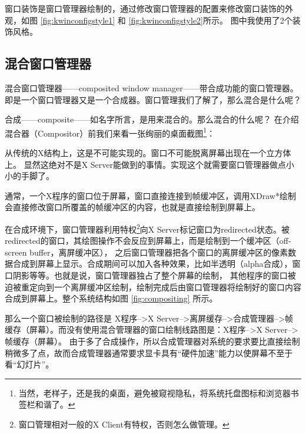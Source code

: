 \documentclass[amstex,twoside]{ctexbook}
\begin{document}
窗口装饰是窗口管理器绘制的，通过修改窗口管理器的配置来修改窗口装饰的外观，如图 \ref{fig:kwinconfigstyle1} 和 \ref{fig:kwinconfigstyle2}所示。
图中我使用了2个装饰风格。



\subsection{混合窗口管理器}

混合窗口管理器——composited window manager——带合成功能的窗口管理器。
即是一个窗口管理器又是一个合成器。窗口管理我们了解了，那么混合是什么呢？

合成——composite——如名字所言，是用来混合的。那么混合的什么呢？
在介绍混合器（Compositor）前我们来看一张绚丽的桌面截图\footnote{当然，老样子，还是我的桌面，避免被窥视隐私，将系统托盘图标和浏览器书签栏和谐了。}：


从传统的X结构上，这是不可能实现的。窗口不可能脱离屏幕出现在一个立方体上。
显然这绝对不是X Server能做到的事情。实现这个就需要窗口管理器做点小小的手脚了。

通常，一个X程序的窗口位于屏幕，窗口直接连接到帧缓冲区，调用XDraw*绘制会直接修改窗口所覆盖的帧缓冲区的内容，也就是直接绘制到屏幕上。


在合成环境下，窗口管理器利用特权\footnote{窗口管理相对一般的X Client有特权，否则怎么做管理。}向X Server标记窗口为redirected状态。被redirected的窗口，其绘图操作不会反应到屏幕上，而是绘制到一个缓冲区（off-screen buffer，离屏缓冲区）， 之后窗口管理器把各个窗口的离屏缓冲区的像素数据合成到屏幕上显示。合成期间可以加入各种效果，比如半透明（alpha合成），窗口阴影等等。也就是说，窗口管理器独占了整个屏幕的绘制，
其他程序的窗口被迫被重定向到一个离屏缓冲区绘制，绘制完成后由窗口管理器将绘制好的窗口内容合成到屏幕上。整个系统结构如图 \ref{fig:compositing} 所示。


那么一个窗口被绘制的路径是 X程序-->X Server-->离屏缓存-->合成管理器-->帧缓存（屏幕）。而没有使用混合管理器的窗口绘制线路图是：X程序-->X Server-->帧缓存（屏幕）。
由于多了合成操作，所以合成管理器对系统的要求要比直接绘制稍微多了点，故而合成管理器通常要求显卡具有“硬件加速”能力以使屏幕不至于看“幻灯片”。
\end{document}
